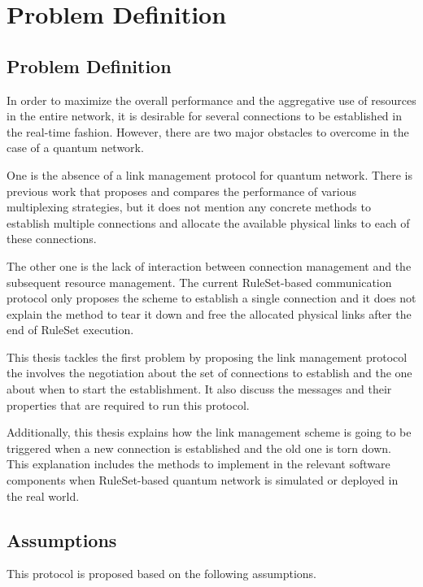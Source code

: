 \chapter{Problem Definition}
\label{problem-definition}

\section{Problem Definition}

In order to maximize the overall performance and the aggregative use of resources in the entire network, it is desirable for several connections to be established in the real-time fashion.
However, there are two major obstacles to overcome in the case of a quantum network. 

One is the absence of a link management protocol for quantum network. There is previous work \cite{aparicio2011multiplexing} that proposes and compares the performance of various multiplexing strategies, but it does not mention any concrete methods to establish multiple connections and allocate the available physical links to each of these connections.

The other one is the lack of interaction between connection management and the subsequent resource management. The current RuleSet-based communication protocol \cite{matsuo2019quantum} only proposes the scheme to establish a single connection and it does not explain the method to tear it down and free the allocated physical links after the end of RuleSet execution. 

This thesis tackles the first problem by proposing the link management protocol the involves the negotiation about the set of connections to establish and the one about when to start the establishment. It also discuss the messages and their properties that are required to run this protocol.

Additionally, this thesis explains how the link management scheme is going to be triggered when a new connection is established and the old one is torn down. This explanation includes the methods to implement in the relevant software components when RuleSet-based quantum network is simulated or deployed in the real world.

\section{Assumptions}

This protocol is proposed based on the following assumptions.

